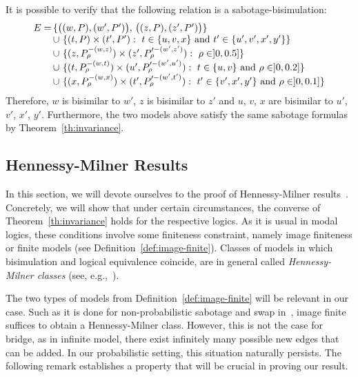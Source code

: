 \begin{example}
It is possible to verify that the following relation is a sabotage-bisimulation:
    \[
    \begin{array}{l@{\,}l}
        E = & \{\big((w,P),(w',P')\big),$ $\big((z,P),(z',P')\big)\} \\ 
            & \cup \ \{(t,P)\times (t',P'): \ t\in\{u,v,x\}\text{ and }t'\in\{u',v',x',y'\}\}\\
            & \cup \ \{(z,P^{-(w,z)}_\rho)\times (z',P'^{-(w',z')}_\rho): \ \rho\in ]0,0.5]\}\\
            &\cup \ \{(t,P^{-(w,t)}_\rho)\times (u',P'^{-(w',u')}_\rho): \ t\in\{u,v\}\text{ and }\rho\in]0,0.2]\}\\
            & \cup \ \{(x,P^{-(w,x)}_\rho)\times (t',P'^{-(w',t')}_\rho): \ t'\in\{v',x',y'\}\text{ and }\rho\in]0,0.1]\}
    \end{array}
    \]
Therefore, $w$ is bisimilar to $w'$, $z$ is bisimilar to $z'$ and $u$, $v$, $x$ are bisimilar to $u'$, $v'$, $x'$, $y'$. Furthermore, the two models above satisfy the same sabotage formulas by Theorem~\ref{th:invariance}.

\end{example}

\subsection{Hennessy-Milner Results}
\label{sec:henmilner}

In this section, we will devote ourselves to the proof of Hennessy-Milner results~\cite{vanbenthem1977modal}. Concretely, we will show that under certain circumstances, the converse of Theorem~\ref{th:invariance} holds for the respective logics. As it is usual in modal logics, these conditions involve some finiteness constraint, namely image finiteness or finite models (see Definition~\ref{def:image-finite}). Classes of models in which bisimulation and logical equivalence coincide, are in general called \emph{Hennessy-Milner classes} (see, e.g.,~\cite{BlackburnRV01}). 

%

The two types of models from Definition~\ref{def:image-finite} will be relevant in our case. Such as it is done for non-probabilistic sabotage and swap in~\cite{ArecesFH15}, image finite suffices to obtain a Hennessy-Milner class. However, this is not the case for bridge, as in infinite model, there exist  infinitely many possible new edges that can be added. In our probabilistic setting, this situation naturally persists. The following remark establishes a property that will be crucial in proving our result.

